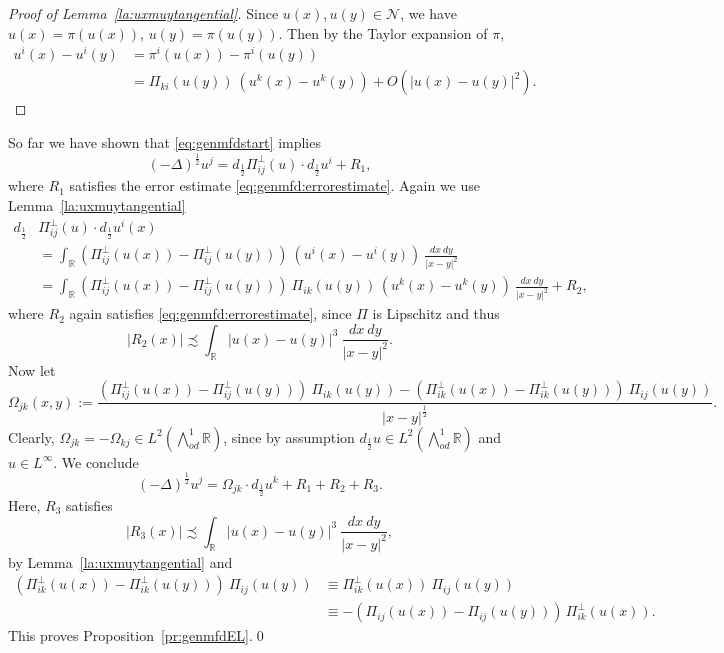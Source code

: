 \documentclass[12pt]{amsart}
\theoremstyle{definition}
\newcommand{\R}{\mathbb{R}}
\newcommand{\brac}[1]{\left (#1 \right )}
\newcommand{\Ep}{\bigwedge\nolimits}
\numberwithin{theorem}{section} \numberwithin{equation}{section}
\newcommand{\lap}{\Delta }
\newcommand{\aleq}{\precsim}
\newcommand{\laph}{(-\lap)^{\frac{1}{2}}}
\begin{document}
\begin{proof}[Proof of Lemma~\ref{la:uxmuytangential}]
Since $u(x), u(y) \in \mathcal{N}$, we have $u(x) = \pi(u(x))$, $u(y) = \pi(u(y))$. Then by the Taylor expansion of $\pi$,
\[
\begin{split}
 u^i(x) - u^i(y) &= \pi^i(u(x))-\pi^i(u(y)) \\
 &= \Pi_{ki}(u(y))\ (u^k(x)-u^k(y)) + O(|u(x)-u(y)|^2).
\end{split}
 \]
\end{proof}
% 
So far we have shown that \eqref{eq:genmfdstart} implies
\begin{equation}\label{eq:sofarshown}
 \laph u^j = d_{\frac{1}{2}} \Pi^\perp_{ij}(u)  \cdot d_{\frac{1}{2}} u^i + R_1,
 \end{equation}
where $R_1$ satisfies the error estimate \eqref{eq:genmfd:errorestimate}. Again we use Lemma~\ref{la:uxmuytangential}
\[
 \begin{split}
 d_{\frac{1}{2}}& \Pi^\perp_{ij}(u)  \cdot d_{\frac{1}{2}} u^i(x)\\
 &=\int_{\R} \brac{\Pi^\perp_{ij}(u(x))-\Pi^\perp_{ij}(u(y))}\ \brac{u^i(x)-u^i(y)}\ \frac{dx\ dy}{|x-y|^2}\\
 &=\int_{\R} \brac{\Pi^\perp_{ij}(u(x))-\Pi^\perp_{ij}(u(y))}\ \Pi_{ik}(u(y))\, \brac{u^k(x)-u^k(y)}\ \frac{dx\ dy}{|x-y|^2}+R_2,
\end{split}
 \]
where $R_2$ again satisfies \eqref{eq:genmfd:errorestimate}, since $\Pi$ is Lipschitz and thus
\[
 |R_2(x)| \aleq \int_{\R} |u(x)-u(y)|^3\ \frac{dx\ dy}{|x-y|^2}. 
\]
Now let 
\[
 \Omega_{jk}(x,y) := \frac{\brac{\Pi^\perp_{ij}(u(x))-\Pi^\perp_{ij}(u(y))}\ \Pi_{ik} (u(y)) - \brac{\Pi^\perp_{ik}(u(x))-\Pi^\perp_{ik}(u(y))}\ \Pi_{ij} (u(y))}{|x-y|^{\frac{1}{2}}}.
\]
Clearly, $\Omega_{jk} = -\Omega_{kj} \in L^2(\Ep^1_{od} \R)$, since by assumption $d_{\frac{1}{2}} u \in L^2(\Ep^1_{od} \R)$ and $u \in L^\infty$. We conclude
\[
 \laph u^j = \Omega_{jk} \cdot d_{\frac{1}{2}} u^k + R_1 + R_2 + R_3.
 \]
Here, $R_3$ satisfies
\[
 |R_3(x)| \aleq \int_{\R} |u(x)-u(y)|^3\ \frac{dx\ dy}{|x-y|^2},
\]
by Lemma~\ref{la:uxmuytangential} and 
\[
\begin{split}
\brac{\Pi^\perp_{ik}(u(x))-\Pi^\perp_{ik}(u(y))}\ \Pi_{ij} (u(y)) & \equiv \Pi^\perp_{ik}(u(x))\ \Pi_{ij} (u(y))\\
&\equiv -(\Pi_{ij} (u(x)) - \Pi_{ij} (u(y)))\, \Pi^\perp_{ik}(u(x)). 
\end{split}
\]
This proves Proposition~\ref{pr:genmfdEL}.\qed
% 
\end{document}
